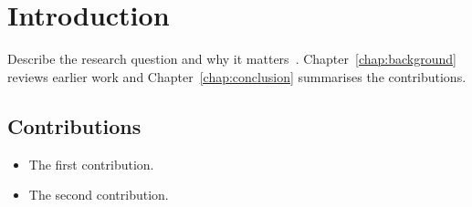 \chapter{Introduction}
\label{chap:intro}

Describe the research question and why it matters~\citep{knuth1984}.
Chapter~\ref{chap:background} reviews earlier work and Chapter~\ref{chap:conclusion}
summarises the contributions.

\section{Contributions}
\begin{itemize}
  \item The first contribution.
  \item The second contribution.
\end{itemize}
